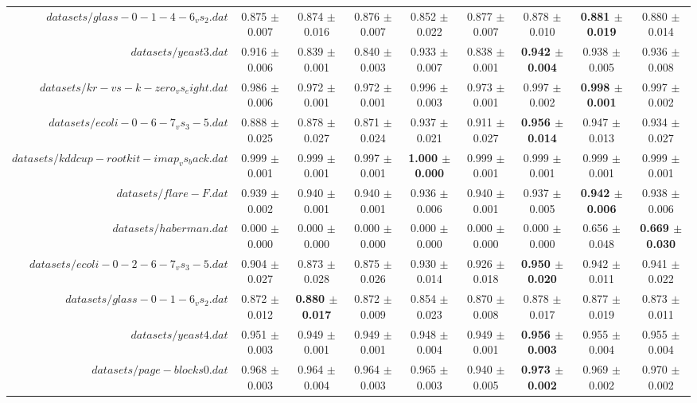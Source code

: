\begin{table}[!ht]
{\begin{tabular}{r c c c c c c c c}
$datasets/glass-0-1-4-6_vs_2.dat$ & 0.875 $\pm$ 0.007 & 0.874 $\pm$ 0.016 & 0.876 $\pm$ 0.007 & 0.852 $\pm$ 0.022 & 0.877 $\pm$ 0.007 & 0.878 $\pm$ 0.010 & \textbf{0.881 $\pm$ 0.019} & 0.880 $\pm$ 0.014 \\
$datasets/yeast3.dat$ & 0.916 $\pm$ 0.006 & 0.839 $\pm$ 0.001 & 0.840 $\pm$ 0.003 & 0.933 $\pm$ 0.007 & 0.838 $\pm$ 0.001 & \textbf{0.942 $\pm$ 0.004} & 0.938 $\pm$ 0.005 & 0.936 $\pm$ 0.008 \\
$datasets/kr-vs-k-zero_vs_eight.dat$ & 0.986 $\pm$ 0.006 & 0.972 $\pm$ 0.001 & 0.972 $\pm$ 0.001 & 0.996 $\pm$ 0.003 & 0.973 $\pm$ 0.001 & 0.997 $\pm$ 0.002 & \textbf{0.998 $\pm$ 0.001} & 0.997 $\pm$ 0.002 \\
$datasets/ecoli-0-6-7_vs_3-5.dat$ & 0.888 $\pm$ 0.025 & 0.878 $\pm$ 0.027 & 0.871 $\pm$ 0.024 & 0.937 $\pm$ 0.021 & 0.911 $\pm$ 0.027 & \textbf{0.956 $\pm$ 0.014} & 0.947 $\pm$ 0.013 & 0.934 $\pm$ 0.027 \\
$datasets/kddcup-rootkit-imap_vs_back.dat$ & 0.999 $\pm$ 0.001 & 0.999 $\pm$ 0.001 & 0.997 $\pm$ 0.001 & \textbf{1.000 $\pm$ 0.000} & 0.999 $\pm$ 0.001 & 0.999 $\pm$ 0.001 & 0.999 $\pm$ 0.001 & 0.999 $\pm$ 0.001 \\
$datasets/flare-F.dat$ & 0.939 $\pm$ 0.002 & 0.940 $\pm$ 0.001 & 0.940 $\pm$ 0.001 & 0.936 $\pm$ 0.006 & 0.940 $\pm$ 0.001 & 0.937 $\pm$ 0.005 & \textbf{0.942 $\pm$ 0.006} & 0.938 $\pm$ 0.006 \\
$datasets/haberman.dat$ & 0.000 $\pm$ 0.000 & 0.000 $\pm$ 0.000 & 0.000 $\pm$ 0.000 & 0.000 $\pm$ 0.000 & 0.000 $\pm$ 0.000 & 0.000 $\pm$ 0.000 & 0.656 $\pm$ 0.048 & \textbf{0.669 $\pm$ 0.030} \\
$datasets/ecoli-0-2-6-7_vs_3-5.dat$ & 0.904 $\pm$ 0.027 & 0.873 $\pm$ 0.028 & 0.875 $\pm$ 0.026 & 0.930 $\pm$ 0.014 & 0.926 $\pm$ 0.018 & \textbf{0.950 $\pm$ 0.020} & 0.942 $\pm$ 0.011 & 0.941 $\pm$ 0.022 \\
$datasets/glass-0-1-6_vs_2.dat$ & 0.872 $\pm$ 0.012 & \textbf{0.880 $\pm$ 0.017} & 0.872 $\pm$ 0.009 & 0.854 $\pm$ 0.023 & 0.870 $\pm$ 0.008 & 0.878 $\pm$ 0.017 & 0.877 $\pm$ 0.019 & 0.873 $\pm$ 0.011 \\
$datasets/yeast4.dat$ & 0.951 $\pm$ 0.003 & 0.949 $\pm$ 0.001 & 0.949 $\pm$ 0.001 & 0.948 $\pm$ 0.004 & 0.949 $\pm$ 0.001 & \textbf{0.956 $\pm$ 0.003} & 0.955 $\pm$ 0.004 & 0.955 $\pm$ 0.004 \\
$datasets/page-blocks0.dat$ & 0.968 $\pm$ 0.003 & 0.964 $\pm$ 0.004 & 0.964 $\pm$ 0.003 & 0.965 $\pm$ 0.003 & 0.940 $\pm$ 0.005 & \textbf{0.973 $\pm$ 0.002} & 0.969 $\pm$ 0.002 & 0.970 $\pm$ 0.002 \\

\end{tabular}}
\end{table}
